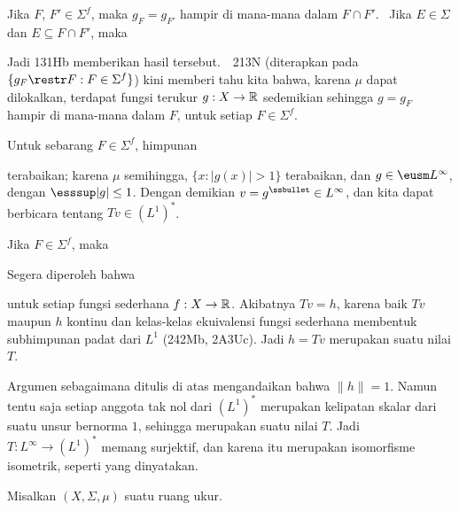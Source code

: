 {\medskip
     
 Jika $F$, $F'\in\Sigma^f$, maka $g_F=g_{F'}$ hampir di
mana-mana dalam $F\cap F'$. \Prf\ Jika $E\in\Sigma$ dan
$E\subseteq F\cap F'$, maka
     
     
\noindent Jadi 131Hb memberikan hasil tersebut.\ \QeD\ 213N (diterapkan
pada $\{g_F\restr F:F\in\Sigma^f\}$) kini memberi tahu kita bahwa, karena
$\mu$ dapat dilokalkan, terdapat fungsi terukur $g:X\to\Bbb R$
sedemikian sehingga $g=g_F$ hampir di mana-mana dalam $F$, untuk setiap
$F\in\Sigma^f$.
     
\medskip
     
 Untuk sebarang $F\in\Sigma^f$, himpunan
     
     
\noindent terabaikan; karena $\mu$ semihingga,
$\{x:|g(x)|>1\}$ terabaikan, dan $g\in\eusm L^{\infty}$, dengan
$\esssup|g|\le 1$. Dengan demikian $v=g^{\ssbullet}\in L^{\infty}$,
dan kita dapat berbicara tentang $Tv\in(L^1)^*$.
     
\medskip
     
 Jika $F\in\Sigma^f$, maka

     
\noindent Segera diperoleh bahwa

     
\noindent untuk setiap fungsi sederhana $f:X\to\Bbb R$.
Akibatnya $Tv=h$, karena baik $Tv$ maupun $h$ kontinu dan kelas-kelas
ekuivalensi fungsi sederhana membentuk subhimpunan padat dari $L^1$
(242Mb, 2A3Uc). Jadi $h=Tv$ merupakan suatu nilai $T$.
     
\medskip
     
 Argumen sebagaimana ditulis di atas mengandaikan bahwa
$\|h\|=1$. Namun tentu saja setiap anggota tak nol dari $(L^1)^*$
merupakan kelipatan skalar dari suatu unsur bernorma $1$, sehingga
merupakan suatu nilai $T$. Jadi $T:L^{\infty}\to(L^1)^*$ memang
surjektif, dan karena itu merupakan isomorfisme isometrik, seperti yang
dinyatakan.
}%
     
 Misalkan $(X,\Sigma,\mu)$ suatu ruang ukur.
     
